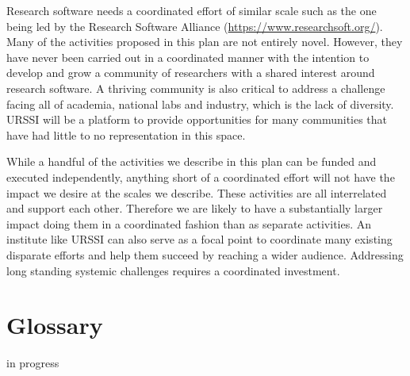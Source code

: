 \documentclass[
]{book}
\begin{document}
Research software needs a coordinated effort of similar scale such as the one being led by the Research Software Alliance (\url{https://www.researchsoft.org/}). Many of the activities proposed in this plan are not entirely novel. However, they have never been carried out in a coordinated manner with the intention to develop and grow a community of researchers with a shared interest around research software. A thriving community is also critical to address a challenge facing all of academia, national labs and industry, which is the lack of diversity. URSSI will be a platform to provide opportunities for many communities that have had little to no representation in this space.

While a handful of the activities we describe in this plan can be funded and executed independently, anything short of a coordinated effort will not have the impact we desire at the scales we describe. These activities are all interrelated and support each other. Therefore we are likely to have a substantially larger impact doing them in a coordinated fashion than as separate activities. An institute like URSSI can also serve as a focal point to coordinate many existing disparate efforts and help them succeed by reaching a wider audience. Addressing long standing systemic challenges requires a coordinated investment.

\hypertarget{glossary}{%
\chapter*{Glossary}\label{glossary}}

in progress

  
\end{document}

